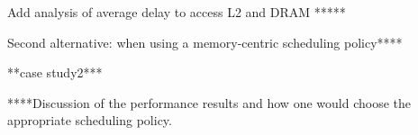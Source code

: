 Add analysis of average delay to access L2 and DRAM *****

Second alternative: when using a memory-centric scheduling policy****



**case study2***


****Discussion of the performance results and how one would choose the appropriate scheduling policy.